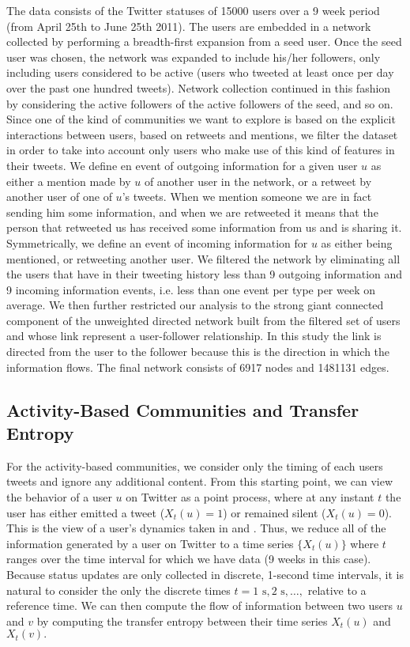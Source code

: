 The data consists of the Twitter statuses of 15000 users over a 9 week period (from April 25th to June 25th 2011). The users are embedded in a network collected by performing a breadth-first expansion from a seed user. Once the seed user was chosen, the network was expanded to include his/her followers, only including users considered to be active (users who tweeted at least once per day over the past one hundred tweets). Network collection continued in this fashion by considering the active followers of the active followers of the seed, and so on.
Since one of the kind of communities we want to explore is based on the explicit interactions between users, based on retweets and mentions, we filter the dataset in order to take into account only users who make use of this kind of features in their tweets. We define en event of outgoing information for a given user $u$ as either a mention made by $u$ of another user in the network, or a retweet by another user of one of $u$'s tweets. When we mention someone we are in fact sending him some information, and when we are retweeted it means that the person that retweeted us has received some information from us and is sharing it. Symmetrically, we define an event of incoming information for $u$ as either being mentioned, or retweeting another user. We filtered the network by eliminating all the users that have in their tweeting history less than 9 outgoing information and 9 incoming information events, i.e. less than one event per type per week on average. We then further restricted our analysis to the strong giant connected component of the unweighted directed network built from the filtered set of users and whose link represent a user-follower relationship. In this study the link is directed from the user to the follower because this is the direction in which the information flows. The final network consists of 6917 nodes and 1481131 edges.

\subsection{Activity-Based Communities and Transfer Entropy}
\label{sec:method-activity}

For the activity-based communities, we consider only the timing of each users tweets and ignore any additional content. From this starting point, we can view the behavior of a user $u$ on Twitter as a point process, where at any instant $t$ the user has either emitted a tweet ($X_{t}(u) = 1$) or remained silent ($X_{t}(u) = 0$). This is the view of a user's dynamics taken in \cite{ver2012information} and \cite{darmon2013understanding}. Thus, we reduce all of the information generated by a user on Twitter to a time series $\{ X_{t}(u)\}$ where $t$ ranges over the time interval for which we have data (9 weeks in this case). Because status updates are only collected in discrete, 1-second time intervals, it is natural to consider the only the discrete times $t = 1 \text{ s}, 2 \text{ s}, \ldots, $ relative to a reference time. We can then compute the flow of information between two users $u$ and $v$ by computing the transfer entropy between their time series $X_{t}(u)$ and $X_{t}(v).$

